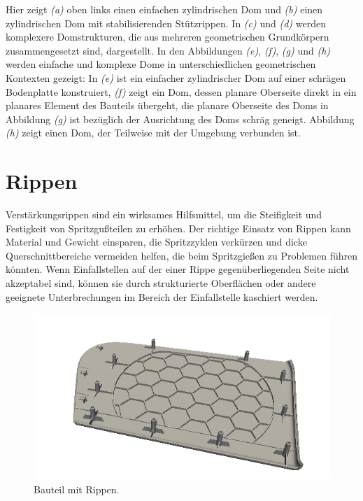 Hier zeigt \textit{(a)} oben links einen einfachen zylindrischen Dom und \textit{(b)} einen zylindrischen Dom mit stabilisierenden St\"utzrippen. In \textit{(c)} und \textit{(d)} werden komplexere Domstrukturen, die aus mehreren geometrischen Grundk\"orpern zusammengesetzt sind, dargestellt. In den Abbildungen \textit{(e)}, \textit{(f)}, \textit{(g)} und \textit{(h)} werden einfache und komplexe Dome in unterschiedlichen geometrischen Kontexten gezeigt: In \textit{(e)} ist ein einfacher zylindrischer Dom auf einer schr\"agen Bodenplatte konstruiert, \textit{(f)} zeigt ein Dom, dessen planare Oberseite direkt in ein planares Element des Bauteils \"ubergeht, die planare Oberseite des Doms in Abbildung \textit{(g)} ist bez\"uglich der Ausrichtung des Doms schr\"ag geneigt. Abbildung \textit{(h)} zeigt einen Dom, der Teilweise mit der Umgebung verbunden ist.  
 
\section{Rippen}
\label{sec:rips}
 
Verst\"arkungsrippen sind ein wirksames Hilfsmittel, um die Steifigkeit und Festigkeit von Spritzgu{\ss}teilen zu erhöhen. Der richtige Einsatz von Rippen kann Material und Gewicht einsparen, die Spritzzyklen verkürzen und dicke Querschnittbereiche vermeiden helfen, die beim Spritzgie{\ss}en zu Problemen führen könnten. Wenn Einfallstellen auf der einer Rippe gegen\"uberliegenden Seite nicht akzeptabel sind, k\"onnen sie durch strukturierte Oberflächen oder andere geeignete Unterbrechungen im Bereich der Einfallstelle kaschiert werden.  

\begin{figure}[H]
\centerline{
	\includegraphics[width=0.8\columnwidth]{graphics/domTeil1.png}}
\caption{Bauteil mit Rippen.}
\label{im:goCart}
\end{figure}

